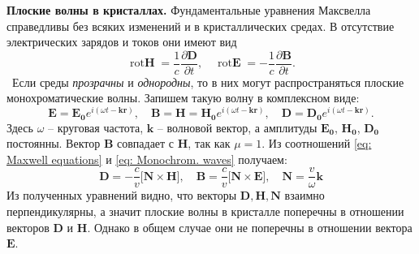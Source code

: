 \documentclass[a4paper,12pt]{article}
\begin{document}
\textbf{Плоские волны в кристаллах.}
Фундаментальные уравнения Максвелла справедливы без всяких изменений и в кристаллических средах. В отсутствие электрических зарядов и токов они имеют вид
\begin{equation}\label{eq: Maxwell equations}
    \operatorname{rot\mathbf{H}} = \frac{1}{c} \frac{\partial\mathbf{D}}{\partial t}, \quad \operatorname{rot\mathbf{E}} = -\frac{1}{c} \frac{\partial\mathbf{B}}{\partial t}.
\end{equation}\
Если среды \textit{прозрачны} и \textit{однородны}, то в них могут распространяться плоские монохроматические волны. Запишем такую волну в комплексном виде:
\begin{equation}\label{eq: Monochrom. waves}
    \mathbf{E} = \mathbf{E_0} e^{i(\omega t - \mathbf{k}\mathbf{r})}, \quad
    \mathbf{B} = \mathbf{H} = \mathbf{H_0} e^{i(\omega t - \mathbf{k}\mathbf{r})}, \quad
    \mathbf{D} = \mathbf{D_0} e^{i(\omega t - \mathbf{k}\mathbf{r})}.
\end{equation}
Здесь $\omega$ -- круговая частота, $\mathbf{k}$ -- волновой вектор, а амплитуды $\mathbf{E_0}$, $\mathbf{H_0}$, $\mathbf{D_0}$ постоянны. Вектор $\mathbf{B}$ совпадает с $\mathbf{H}$, так как $\mu = 1$. Из соотношений \eqref{eq: Maxwell equations} и \eqref{eq: Monochrom. waves} получаем:
\begin{equation}\label{eq: D and H via N}
    \mathbf{D} = -\frac{c}{v} \Big[\mathbf{N} \times \mathbf{H}\Big], \quad
    \mathbf{B} = \frac{c}{v} \Big[\mathbf{N} \times \mathbf{E}\Big], \quad
    \mathbf{N} = \frac{v}{\omega}\mathbf{k}
\end{equation}
Из полученных уравнений видно, что векторы $\mathbf{D}, \mathbf{H}, \mathbf{N}$ взаимно перпендикулярны, а значит плоские волны в кристалле поперечны в отношении векторов $\mathbf{D}$ и $\mathbf{H}$. Однако в общем случае они не поперечны в отношении вектора $\mathbf{E}$. 
\end{document}
